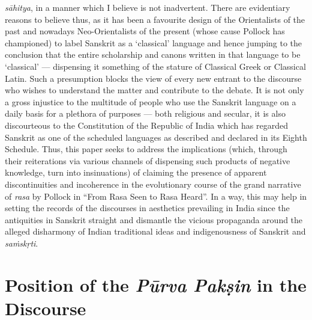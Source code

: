 \textsl{sāhitya}, in a manner which I believe is not inadvertent. There are evidentiary reasons to believe thus, as it has been a favourite design of the Orientalists of the past and nowadays Neo-Orientalists of the present (whose cause Pollock has championed) to label Sanskrit as a ‘classical’ language and hence jumping to the conclusion that the entire scholarship and canons written in that language to be ‘classical’ --- dispensing it something of the stature of Classical Greek or Classical Latin. Such a presumption blocks the view of every new entrant to the discourse who wishes to understand the matter and contribute to the debate. It is not only a gross injustice to the multitude of people who use the Sanskrit language on a daily basis for a plethora of purposes --- both religious and secular, it is also discourteous to the Constitution of the Republic of India which has regarded Sanskrit as one of the scheduled languages as described and declared in its Eighth Schedule. Thus, this paper seeks to address the implications (which, through their reiterations via various channels of dispensing such products of negative knowledge, turn into insinuations) of claiming the presence of apparent discontinuities and incoherence in the evolutionary course of the grand narrative of \textsl{rasa} by Pollock in “From Rasa Seen to Rasa Heard”. In a way, this may help in setting the records of the discourses in aesthetics prevailing in India since the antiquities in Sanskrit straight and dismantle the vicious propaganda around the alleged disharmony of Indian traditional ideas and indigenousness of Sanskrit and \textsl{saṁskṛti}.\\[-21pt]

\section*{Position of the \textsl{Pūrva Pakṣin} in the Discourse}

